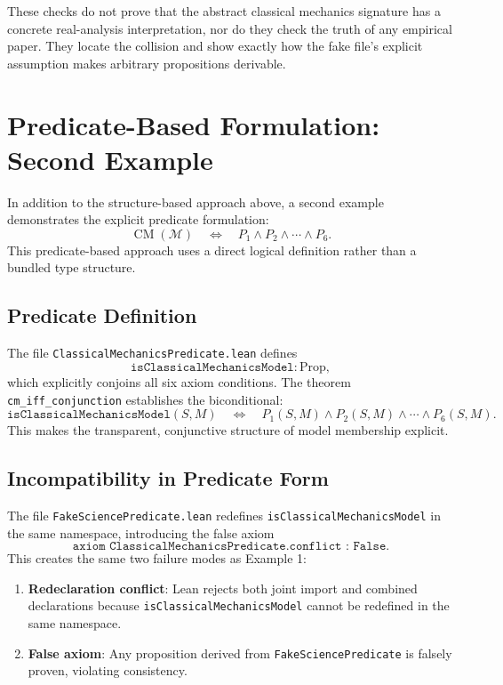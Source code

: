 \documentclass[11pt]{article}
\begin{document}
These checks do not prove that the abstract classical mechanics
signature has a concrete real-analysis interpretation, nor do they check
the truth of any empirical paper. They locate the collision and show
exactly how the fake file's explicit assumption makes arbitrary
propositions derivable.

\section{Predicate-Based Formulation: Second Example}

In addition to the structure-based approach above, a second example
demonstrates the explicit predicate formulation:
\[
  \operatorname{CM}(\mathcal{M}) \quad\Longleftrightarrow\quad
  P_1 \land P_2 \land \cdots \land P_6.
\]
This predicate-based approach uses a direct logical definition rather
than a bundled type structure.

\subsection{Predicate Definition}

The file \texttt{ClassicalMechanicsPredicate.lean} defines
\[
  \texttt{isClassicalMechanicsModel} : \mathrm{Prop},
\]
which explicitly conjoins all six axiom conditions. The theorem
\texttt{cm\_iff\_conjunction} establishes the biconditional:
\[
  \texttt{isClassicalMechanicsModel}(S, M)
  \quad\Longleftrightarrow\quad
  P_1(S, M) \land P_2(S, M) \land \cdots \land P_6(S, M).
\]
This makes the transparent, conjunctive structure of model membership explicit.

\subsection{Incompatibility in Predicate Form}

The file \texttt{FakeSciencePredicate.lean} redefines
\texttt{isClassicalMechanicsModel} in the same namespace, introducing the false
axiom
\[
  \texttt{axiom ClassicalMechanicsPredicate.conflict : False}.
\]
This creates the same two failure modes as Example 1:
\begin{enumerate}
  \item \textbf{Redeclaration conflict}: Lean rejects both joint import and
    combined declarations because \texttt{isClassicalMechanicsModel} cannot
    be redefined in the same namespace.
  \item \textbf{False axiom}: Any proposition derived from
    \texttt{FakeSciencePredicate} is falsely proven, violating consistency.
\end{enumerate}
\end{document}
